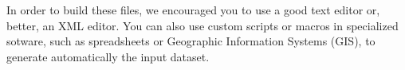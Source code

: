 \noindent In order to build these files, we encouraged you to use a good text
editor or, better, an XML editor. You can also use custom scripts or macros in
specialized sotware, such as spreadsheets or Geographic Information Systems
(GIS), to generate automatically the input dataset.

\bigskip

% 
% 
% 
% 

